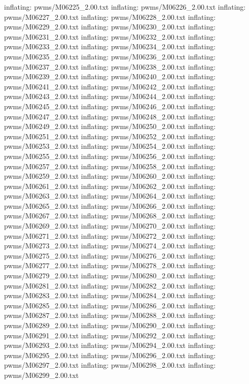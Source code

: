\documentclass[letterpaper,10pt,english]{sphinxmanual}
\begin{document}
{\begin{sphinxVerbatim}[commandchars=\\\{\}]
  inflating: pwms/M06225\_2.00.txt
  inflating: pwms/M06226\_2.00.txt
  inflating: pwms/M06227\_2.00.txt
  inflating: pwms/M06228\_2.00.txt
  inflating: pwms/M06229\_2.00.txt
  inflating: pwms/M06230\_2.00.txt
  inflating: pwms/M06231\_2.00.txt
  inflating: pwms/M06232\_2.00.txt
  inflating: pwms/M06233\_2.00.txt
  inflating: pwms/M06234\_2.00.txt
  inflating: pwms/M06235\_2.00.txt
  inflating: pwms/M06236\_2.00.txt
  inflating: pwms/M06237\_2.00.txt
  inflating: pwms/M06238\_2.00.txt
  inflating: pwms/M06239\_2.00.txt
  inflating: pwms/M06240\_2.00.txt
  inflating: pwms/M06241\_2.00.txt
  inflating: pwms/M06242\_2.00.txt
  inflating: pwms/M06243\_2.00.txt
  inflating: pwms/M06244\_2.00.txt
  inflating: pwms/M06245\_2.00.txt
  inflating: pwms/M06246\_2.00.txt
  inflating: pwms/M06247\_2.00.txt
  inflating: pwms/M06248\_2.00.txt
  inflating: pwms/M06249\_2.00.txt
  inflating: pwms/M06250\_2.00.txt
  inflating: pwms/M06251\_2.00.txt
  inflating: pwms/M06252\_2.00.txt
  inflating: pwms/M06253\_2.00.txt
  inflating: pwms/M06254\_2.00.txt
  inflating: pwms/M06255\_2.00.txt
  inflating: pwms/M06256\_2.00.txt
  inflating: pwms/M06257\_2.00.txt
  inflating: pwms/M06258\_2.00.txt
  inflating: pwms/M06259\_2.00.txt
  inflating: pwms/M06260\_2.00.txt
  inflating: pwms/M06261\_2.00.txt
  inflating: pwms/M06262\_2.00.txt
  inflating: pwms/M06263\_2.00.txt
  inflating: pwms/M06264\_2.00.txt
  inflating: pwms/M06265\_2.00.txt
  inflating: pwms/M06266\_2.00.txt
  inflating: pwms/M06267\_2.00.txt
  inflating: pwms/M06268\_2.00.txt
  inflating: pwms/M06269\_2.00.txt
  inflating: pwms/M06270\_2.00.txt
  inflating: pwms/M06271\_2.00.txt
  inflating: pwms/M06272\_2.00.txt
  inflating: pwms/M06273\_2.00.txt
  inflating: pwms/M06274\_2.00.txt
  inflating: pwms/M06275\_2.00.txt
  inflating: pwms/M06276\_2.00.txt
  inflating: pwms/M06277\_2.00.txt
  inflating: pwms/M06278\_2.00.txt
  inflating: pwms/M06279\_2.00.txt
  inflating: pwms/M06280\_2.00.txt
  inflating: pwms/M06281\_2.00.txt
  inflating: pwms/M06282\_2.00.txt
  inflating: pwms/M06283\_2.00.txt
  inflating: pwms/M06284\_2.00.txt
  inflating: pwms/M06285\_2.00.txt
  inflating: pwms/M06286\_2.00.txt
  inflating: pwms/M06287\_2.00.txt
  inflating: pwms/M06288\_2.00.txt
  inflating: pwms/M06289\_2.00.txt
  inflating: pwms/M06290\_2.00.txt
  inflating: pwms/M06291\_2.00.txt
  inflating: pwms/M06292\_2.00.txt
  inflating: pwms/M06293\_2.00.txt
  inflating: pwms/M06294\_2.00.txt
  inflating: pwms/M06295\_2.00.txt
  inflating: pwms/M06296\_2.00.txt
  inflating: pwms/M06297\_2.00.txt
  inflating: pwms/M06298\_2.00.txt
  inflating: pwms/M06299\_2.00.txt

\end{sphinxVerbatim}}
\end{document}

